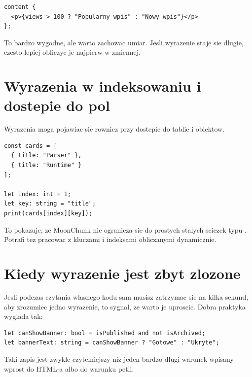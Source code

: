 \begin{lstlisting}[style=moonchunk,caption={Wyrazenie wewnatrz content}]
content {
  <p>{views > 100 ? "Popularny wpis" : "Nowy wpis"}</p>
};
\end{lstlisting}

To bardzo wygodne, ale warto zachowac umiar. Jesli wyrazenie staje sie dlugie,
czesto lepiej obliczyc je najpierw w zmiennej.

\section{Wyrazenia w indeksowaniu i dostepie do pol}
Wyrazenia moga pojawiac sie rowniez przy dostepie do tablic i obiektow.

\begin{lstlisting}[style=moonchunk,caption={Dostep dynamiczny do danych}]
const cards = [
  { title: "Parser" },
  { title: "Runtime" }
];

let index: int = 1;
let key: string = "title";
print(cards[index][key]);
\end{lstlisting}

To pokazuje, ze MoonChunk nie ogranicza sie do prostych stalych sciezek typu
. Potrafi tez pracowac z kluczami i indeksami obliczanymi dynamicznie.

\section{Kiedy wyrazenie jest zbyt zlozone}
Jesli podczas czytania wlasnego kodu sam musisz zatrzymac sie na kilka sekund, aby
zrozumiec jedno wyrazenie, to sygnal, ze warto je uproscic. Dobra praktyka wyglada tak:

\begin{lstlisting}[style=moonchunk,caption={Uproszczenie przez zmienne pomocnicze}]
let canShowBanner: bool = isPublished and not isArchived;
let bannerText: string = canShowBanner ? "Gotowe" : "Ukryte";
\end{lstlisting}

Taki zapis jest zwykle czytelniejszy niz jeden bardzo dlugi warunek wpisany wprost do
HTML-a albo do warunku petli.
